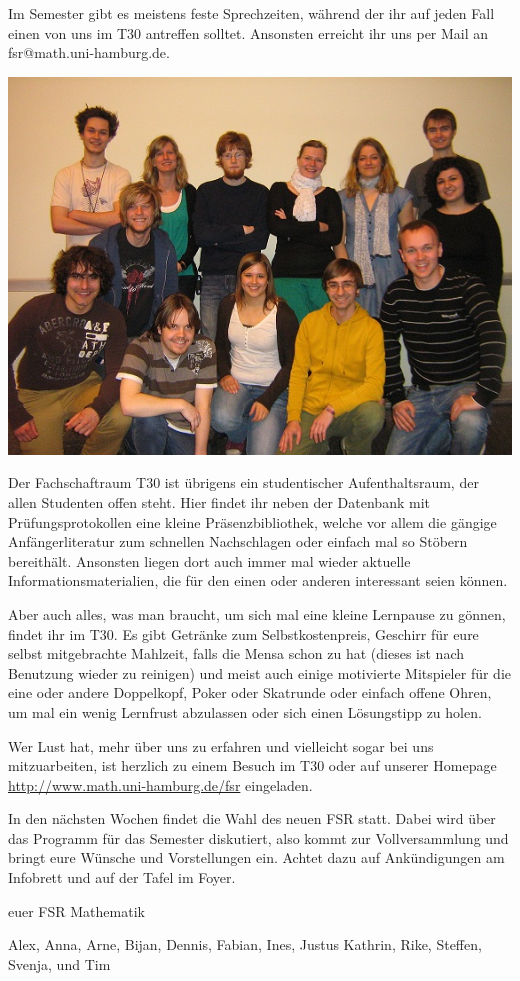 Im Semester gibt es meistens feste Sprechzeiten, während der ihr auf jeden Fall
einen von uns im T30 antreffen solltet. Ansonsten erreicht ihr uns per Mail an
fsr@math.uni-hamburg.de.

\begin{center}
\includegraphics[scale=1.5]{images/fsrsose2011}
\end{center}

Der Fachschaftraum T30 ist übrigens ein studentischer Aufenthaltsraum, der
allen Studenten offen steht. Hier findet ihr neben der Datenbank mit
Prüfungsprotokollen eine kleine Präsenzbibliothek, welche vor allem die gängige
Anfängerliteratur zum schnellen Nachschlagen oder einfach mal so Stöbern
bereithält. Ansonsten liegen dort auch immer mal wieder aktuelle
Informationsmaterialien, die für den einen oder anderen interessant seien können.

Aber auch alles, was man braucht, um sich mal eine kleine Lernpause zu gönnen,
findet ihr im T30. Es gibt Getränke zum Selbstkostenpreis, Geschirr für eure
selbst mitgebrachte Mahlzeit, falls die Mensa schon zu hat (dieses ist nach
Benutzung wieder zu reinigen) und meist auch einige motivierte Mitspieler für
die eine oder andere Doppelkopf, Poker oder Skatrunde oder einfach offene
Ohren, um mal ein wenig Lernfrust abzulassen oder sich einen Lösungstipp zu
holen.

Wer Lust hat, mehr über uns zu erfahren und vielleicht sogar bei uns
mitzuarbeiten, ist herzlich zu einem Besuch im T30 oder auf unserer Homepage
\url{http://www.math.uni-hamburg.de/fsr} eingeladen.

In den nächsten Wochen findet die Wahl des neuen FSR statt. Dabei wird über das
Programm für das Semester diskutiert, also kommt zur Vollversammlung und bringt
eure Wünsche und Vorstellungen ein. Achtet dazu auf Ankündigungen am Infobrett
und auf der Tafel im Foyer.

\hfill euer FSR Mathematik

\hfill Alex, Anna, Arne, Bijan, Dennis, Fabian, Ines, Justus Kathrin, Rike,
Steffen, Svenja, und Tim
